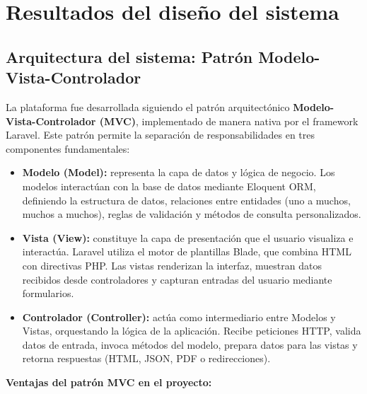 \section{Resultados del diseño del sistema}

\subsection{Arquitectura del sistema: Patrón Modelo-Vista-Controlador}

La plataforma fue desarrollada siguiendo el patrón arquitectónico \textbf{Modelo-Vista-Controlador (MVC)}, implementado de manera nativa por el framework Laravel. Este patrón permite la separación de responsabilidades en tres componentes fundamentales:

\begin{itemize}
    \item \textbf{Modelo (Model):} representa la capa de datos y lógica de negocio. Los modelos interactúan con la base de datos mediante Eloquent ORM, definiendo la estructura de datos, relaciones entre entidades (uno a muchos, muchos a muchos), reglas de validación y métodos de consulta personalizados.
    
    \item \textbf{Vista (View):} constituye la capa de presentación que el usuario visualiza e interactúa. Laravel utiliza el motor de plantillas Blade, que combina HTML con directivas PHP. Las vistas renderizan la interfaz, muestran datos recibidos desde controladores y capturan entradas del usuario mediante formularios.
    
    \item \textbf{Controlador (Controller):} actúa como intermediario entre Modelos y Vistas, orquestando la lógica de la aplicación. Recibe peticiones HTTP, valida datos de entrada, invoca métodos del modelo, prepara datos para las vistas y retorna respuestas (HTML, JSON, PDF o redirecciones).
\end{itemize}

\textbf{Ventajas del patrón MVC en el proyecto:}

